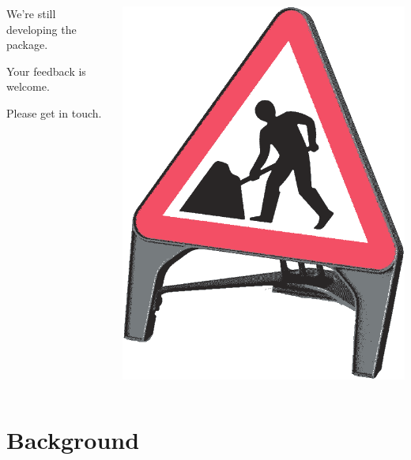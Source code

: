 \documentclass[11pt]{beamer}
\begin{document}
\begin{frame}[c]
	\centering
	\begin{columns}
		\begin{column}[c]{0.6\textwidth}
			We're still developing the package.

			Your feedback is welcome.

			Please get in touch.
		\end{column}
		\begin{column}[c]{0.3\textwidth}
			\centering
			\includegraphics[width=\linewidth]{figures/roadwork-sign.png}
		\end{column}
	\end{columns}

\end{frame}

\section{Background}
\end{document}
